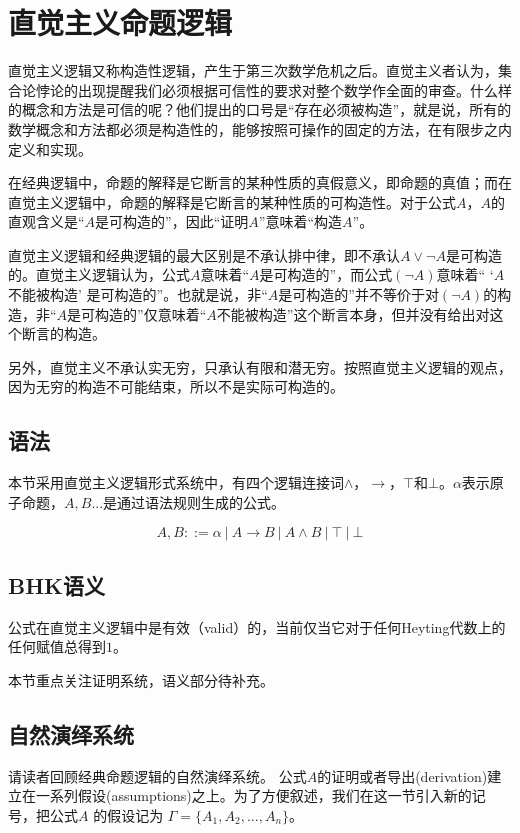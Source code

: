 \section{直觉主义命题逻辑}

直觉主义逻辑又称构造性逻辑，产生于第三次数学危机之后。直觉主义者认为，集合论悖论的出现提醒我们必须根据可信性的要求对整个数学作全面的审查。什么样的概念和方法是可信的呢？他们提出的口号是``存在必须被构造''，就是说，所有的数学概念和方法都必须是构造性的，能够按照可操作的固定的方法，在有限步之内定义和实现。


在经典逻辑中，命题的解释是它断言的某种性质的真假意义，即命题的真值；而在直觉主义逻辑中，命题的解释是它断言的某种性质的可构造性。对于公式$A$，$A$的直观含义是``$A$是可构造的''，因此``证明$A$''意味着``构造$A$''。


直觉主义逻辑和经典逻辑的最大区别是不承认排中律，即不承认$A \lor \neg A$是可构造的。直觉主义逻辑认为，公式$A$意味着``$A$是可构造的''，而公式$(\neg A)$意味着`` `$A$不能被构造' 是可构造的''。也就是说，非``$A$是可构造的''并不等价于对$(\neg A)$的构造，非``$A$是可构造的''仅意味着``$A$不能被构造''这个断言本身，但并没有给出对这个断言的构造。

另外，直觉主义不承认实无穷，只承认有限和潜无穷。按照直觉主义逻辑的观点，因为无穷的构造不可能结束，所以不是实际可构造的。


\subsection{语法}

本节采用直觉主义逻辑形式系统中，有四个逻辑连接词$\land$，$\to$，$\top$和$\bot$。$\alpha$表示原子命题，$A, B...$是通过语法规则生成的公式。

$$A, B ::= \alpha \ | \ A \to B \ | \ A \land B \ | \ \top \ | \ \bot$$


\subsection{BHK语义}

公式在直觉主义逻辑中是有效（valid）的，当前仅当它对于任何Heyting代数上的任何赋值总得到$1$。

本节重点关注证明系统，语义部分待补充。



\subsection{自然演绎系统}

请读者回顾经典命题逻辑的自然演绎系统。 公式$A$的证明或者导出(derivation)建立在一系列假设(assumptions)之上。为了方便叙述，我们在这一节引入新的记号，把公式$A$ 的假设记为 $\Gamma = \{A_1, A_2,...,A_n\}$。

